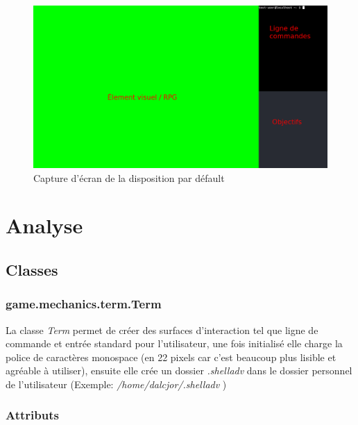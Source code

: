 \documentclass{report}
\begin{document}
\begin{figure}
  \includegraphics[width=\linewidth]{img/image1}
  \caption{Capture d'écran de la disposition par défault}
  \label{fig:screen1}
\end{figure}

\chapter{Analyse}
\section{Classes}
\subsection{game.mechanics.term.Term}
La classe \emph{Term} permet de créer des surfaces d'interaction tel que ligne de commande et entrée standard pour l’utilisateur, une fois initialisé elle charge la police de caractères monospace (en 22 pixels car c’est beaucoup plus lisible et agréable à utiliser), ensuite elle crée un dossier \emph{.shelladv} dans le dossier personnel de l’utilisateur (Exemple: \emph{/home/dalcjor/.shelladv} )
\subsection*{Attributs}
\end{document}
